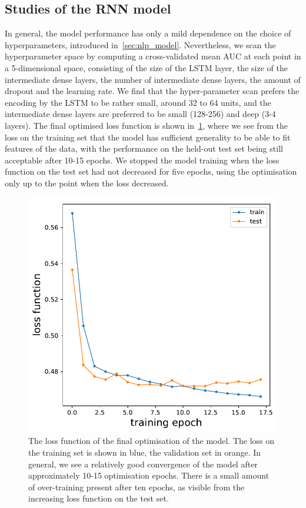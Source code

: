 \subsection{Studies of the RNN model}
In general, the model performance has only a mild dependence on the choice of hyperparameters, introduced in~\cref{sec:nlp_model}. Nevertheless, we scan the hyperparameter space by computing a cross-validated mean AUC at each point in a 5-dimensional space, consisting of the size of the LSTM layer, the size of the intermediate dense layers, the number of intermediate dense layers, the amount of dropout and the learning rate. We find that the hyper-parameter scan prefers the encoding by the LSTM to be rather small, around 32 to 64 units, and the intermediate dense layers are preferred to be small (128-256) and deep (3-4 layers). The final optimised loss function is shown in~\cref{fig:loss}, where we see from the loss on the training set that the model has sufficient generality to be able to fit features of the data, with the performance on the held-out test set being still acceptable after 10-15 epochs. We stopped the model training when the loss function on the test set had not decreased for five epochs, using the optimisation only up to the point when the loss decreased. 

\begin{figure}[ht]
\centering
\includegraphics[width=0.5\linewidth]{figures/lingvist/loss.pdf}
\caption[Loss function for the knowledge estimation model]{The loss function of the final optimisation of the model. The loss on the training set is shown in blue, the validation set in orange. In general, we see a relatively good convergence of the model after approximately 10-15 optimisation epochs. There is a small amount of over-training present after ten epochs, as visible from the increasing loss function on the test set.} 
\label{fig:loss} 
\end{figure} 

